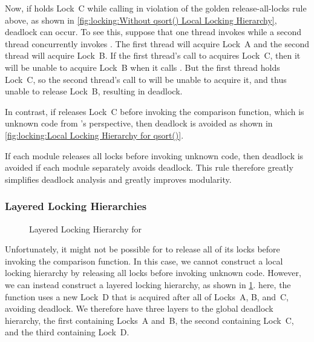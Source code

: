 Now, if  holds Lock~C while calling  in violation
of the golden release-all-locks rule above, as shown in
\cref{fig:locking:Without qsort() Local Locking Hierarchy},
deadlock can occur.
To see this, suppose that one thread invokes  while a second
thread concurrently invokes .
The first thread will acquire Lock~A and the second thread will acquire
Lock~B\@.
If the first thread's call to  acquires Lock~C, then it
will be unable to acquire Lock~B when it calls .
But the first thread holds Lock~C, so the second thread's call to
 will be unable to acquire it, and thus unable to release
Lock~B, resulting in deadlock.

In contrast, if  releases Lock~C before invoking the
comparison function, which is unknown code from 's perspective,
then deadlock is avoided as shown in
\cref{fig:locking:Local Locking Hierarchy for qsort()}.

If each module releases all locks before invoking unknown code, then
deadlock is avoided if each module separately avoids deadlock.
This rule therefore greatly simplifies deadlock analysis and greatly
improves modularity.

\subsubsection{Layered Locking Hierarchies}
\label{sec:locking:Layered Locking Hierarchies}

\begin{figure}
\centering
{}
\caption{Layered Locking Hierarchy for }
\label{fig:locking:Layered Locking Hierarchy for qsort()}
\end{figure}

Unfortunately, it might not be possible for  to release
all of its locks before invoking the comparison function.
In this case, we cannot construct a local locking hierarchy by
releasing all locks before invoking unknown code.
However, we can instead construct a layered locking hierarchy, as shown in
\cref{fig:locking:Layered Locking Hierarchy for qsort()}.
here, the  function uses a new Lock~D that is acquired after
all of Locks~A, B, and~C, avoiding deadlock.
We therefore have three layers to the global deadlock hierarchy, the
first containing Locks~A and~B, the second containing Lock~C, and
the third containing Lock~D\@.

